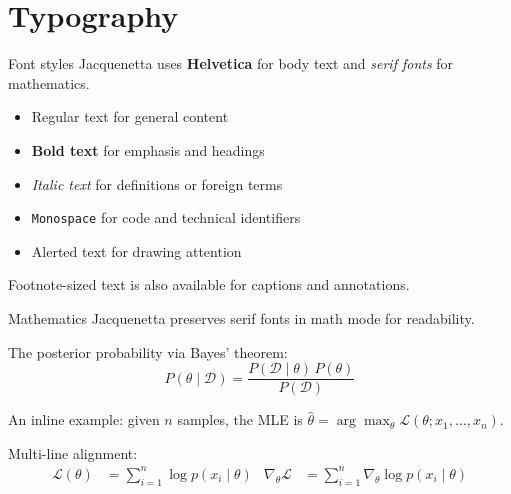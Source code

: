 \documentclass[aspectratio=169]{beamer}
\begin{document}
\section{Typography}


\begin{frame}{Font styles}
    Jacquenetta uses \textbf{Helvetica} for body text and
    \textit{serif fonts} for mathematics.

    \vspace{0.4cm}
    \begin{itemize}
        \item Regular text for general content
        \item \textbf{Bold text} for emphasis and headings
        \item \textit{Italic text} for definitions or foreign terms
        \item \texttt{Monospace} for code and technical identifiers
        \item \alert{Alerted text} for drawing attention
    \end{itemize}

    \vspace{0.4cm}
    {\footnotesize Footnote-sized text is also available for captions
    and annotations.}
\end{frame}

\begin{frame}{Mathematics}
    Jacquenetta preserves serif fonts in math mode for readability.

    \vspace{0.2cm}
    The posterior probability via Bayes' theorem:
    \[
        P(\theta \mid \mathcal{D}) =
        \frac{P(\mathcal{D} \mid \theta)\, P(\theta)}
             {P(\mathcal{D})}
    \]

    An inline example: given $n$ samples, the MLE is
    $\hat{\theta} = \arg\max_\theta \mathcal{L}(\theta; x_1, \dots, x_n)$.

    \vspace{0.2cm}
    Multi-line alignment:
    \begin{align}
        \mathcal{L}(\theta)
            &= \textstyle\sum_{i=1}^{n} \log p(x_i \mid \theta)
        &
        \nabla_\theta \mathcal{L}
            &= \textstyle\sum_{i=1}^{n}
                \nabla_\theta \log p(x_i \mid \theta)
    \end{align}
\end{frame}
\end{document}
